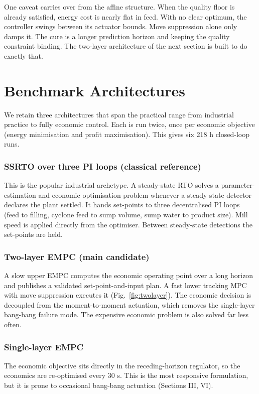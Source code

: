 \documentclass[conference]{IEEEtran}
\begin{document}
One caveat carries over from the affine structure. When the quality floor
is already satisfied, energy cost is nearly flat in feed. With no clear
optimum, the controller swings between its actuator bounds. Move
suppression alone only damps it. The cure is a longer prediction horizon
and keeping the quality constraint binding. The two-layer architecture of
the next section is built to do exactly that.

\section{Benchmark Architectures}

We retain three architectures that span the practical range from industrial
practice to fully economic control. Each is run twice,
once per economic objective (energy minimisation and profit maximisation).
This gives six 218 h closed-loop runs.

\subsubsection{SSRTO over three PI loops (classical reference)}
This is the popular industrial archetype. A steady-state RTO solves a
parameter-estimation and economic optimisation problem whenever a
steady-state detector declares the plant settled. It hands set-points to
three decentralised PI loops (feed to filling, cyclone feed to sump
volume, sump water to product size). Mill speed is applied directly from
the optimiser. Between steady-state detections the set-points are held.

\subsubsection{Two-layer EMPC (main candidate)}
A slow upper EMPC computes the economic operating point over a long
horizon and publishes a validated set-point-and-input plan. A fast lower
tracking MPC with move suppression executes it (Fig.~\ref{fig:twolayer}).
The economic decision is decoupled from the moment-to-moment actuation,
which removes the single-layer bang-bang failure mode. The expensive
economic problem is also solved far less often.

\subsubsection{Single-layer EMPC}
The economic objective sits directly in the receding-horizon regulator, so
the economics are re-optimised every 30 s. This is the most
responsive formulation, but it is prone to occasional bang-bang
actuation (Sections III, VI).
\end{document}
